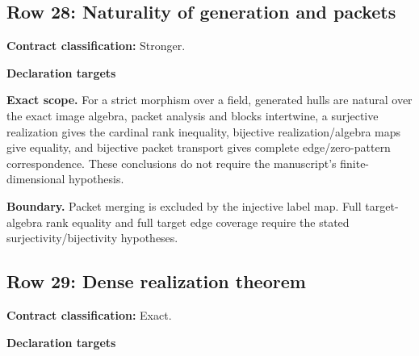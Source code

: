 \medskip
{}\subsection{Row 28: Naturality of generation and packets}
\label{row:28}
\textbf{Contract classification:} Stronger.
\par\smallskip\textbf{Declaration targets}\par
{\small\noindent{}\par}
{\small\noindent{}\par}
{\small\noindent{}\par}
{\small\noindent{}\par}
{\small\noindent{}\par}
\medskip\noindent\textbf{Exact scope.} For a strict morphism over a field, generated hulls are natural over the exact image algebra, packet analysis and blocks intertwine, a surjective realization gives the cardinal rank inequality, bijective realization/algebra maps give equality, and bijective packet transport gives complete edge/zero-pattern correspondence. These conclusions do not require the manuscript's finite-dimensional hypothesis.
\par\smallskip\noindent\textbf{Boundary.} Packet merging is excluded by the injective label map. Full target-algebra rank equality and full target edge coverage require the stated surjectivity/bijectivity hypotheses.
\medskip
{}\subsection{Row 29: Dense realization theorem}
\label{row:29}
\textbf{Contract classification:} Exact.
\par\smallskip\textbf{Declaration targets}\par
{\small\noindent{}\par}
{\small\noindent{}\par}
